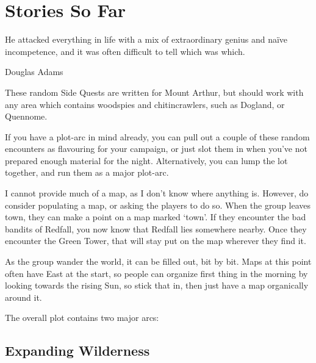 \chapter{Stories So Far}
	\epigraph{He attacked everything in life with a mix of extraordinary genius and na\"ive incompetence, and it was often difficult to tell which was which.}{Douglas Adams}

\begin{multicols}{2}

\noindent
These random Side Quests are written for Mount Arthur, but should work with any area which contains woodspies and chitincrawlers, such as Dogland, or Quennome.

If you have a plot-arc in mind already, you can pull out a couple of these random encounters as flavouring for your campaign, or just slot them in when you've not prepared enough material for the night.
Alternatively, you can lump the lot together, and run them as a major plot-arc.

I cannot provide much of a map, as I don't know where anything is.
However, do consider populating a map, or asking the players to do so.
When the group leaves \gls{town}, they can make a point on a map marked `town'.
If they encounter the bad bandits of Redfall, you now know that Redfall lies somewhere nearby.
Once they encounter the Green Tower, that will stay put on the map wherever they find it.

As the group wander the world, it can be filled out, bit by bit.
Maps at this point often have East at the start, so people can organize first thing in the morning by looking towards the rising Sun, so stick that in, then just have a map organically around it.

The overall plot contains two major arcs:

\end{multicols}

\section{Expanding Wilderness}

